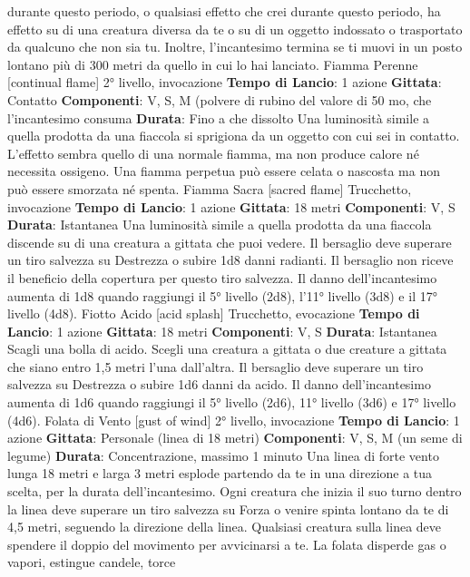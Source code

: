 \begin{multicols}{2}
durante questo periodo, o qualsiasi effetto che crei
durante questo periodo, ha effetto su di una creatura
diversa da te o su di un oggetto indossato o trasportato
da qualcuno che non sia tu. Inoltre, l’incantesimo
termina se ti muovi in un posto lontano più di 300 metri
da quello in cui lo hai lanciato.
Fiamma Perenne
[continual flame]
2° livello, invocazione
\textbf{Tempo di Lancio}: 1 azione
\textbf{Gittata}: Contatto
\textbf{Componenti}: V, S, M (polvere di rubino del valore di 50
mo, che l’incantesimo consuma
\textbf{Durata}: Fino a che dissolto
Una luminosità simile a quella prodotta da una fiaccola
si sprigiona da un oggetto con cui sei in contatto.
L’effetto sembra quello di una normale fiamma, ma non
produce calore né necessita ossigeno. Una fiamma
perpetua può essere celata o nascosta ma non può
essere smorzata né spenta.
Fiamma Sacra
[sacred flame]
Trucchetto, invocazione
\textbf{Tempo di Lancio}: 1 azione
\textbf{Gittata}: 18 metri
\textbf{Componenti}: V, S
\textbf{Durata}: Istantanea
Una luminosità simile a quella prodotta da una fiaccola
discende su di una creatura a gittata che puoi vedere. Il
bersaglio deve superare un tiro salvezza su Destrezza
o subire 1d8 danni radianti. Il bersaglio non riceve il
beneficio della copertura per questo tiro salvezza.
Il danno dell’incantesimo aumenta di 1d8 quando
raggiungi il 5° livello (2d8), l’11° livello (3d8) e il 17°
livello (4d8).
Fiotto Acido
[acid splash]
Trucchetto, evocazione
\textbf{Tempo di Lancio}: 1 azione
\textbf{Gittata}: 18 metri
\textbf{Componenti}: V, S
\textbf{Durata}: Istantanea
Scagli una bolla di acido. Scegli una creatura a gittata o
due creature a gittata che siano entro 1,5 metri l’una
dall’altra. Il bersaglio deve superare un tiro salvezza su
Destrezza o subire 1d6 danni da acido.
Il danno dell’incantesimo aumenta di 1d6 quando
raggiungi il 5° livello (2d6), 11° livello (3d6) e 17° livello
(4d6).
Folata di Vento
[gust of wind]
2° livello, invocazione
\textbf{Tempo di Lancio}: 1 azione
\textbf{Gittata}: Personale (linea di 18 metri)
\textbf{Componenti}: V, S, M (un seme di legume)
\textbf{Durata}: Concentrazione, massimo 1 minuto
Una linea di forte vento lunga 18 metri e larga 3 metri
esplode partendo da te in una direzione a tua scelta,
per la durata dell’incantesimo. Ogni creatura che inizia il
suo turno dentro la linea deve superare un tiro salvezza
su Forza o venire spinta lontano da te di 4,5 metri,
seguendo la direzione della linea.
Qualsiasi creatura sulla linea deve spendere il doppio
del movimento per avvicinarsi a te.
La folata disperde gas o vapori, estingue candele, torce

\end{multicols}
